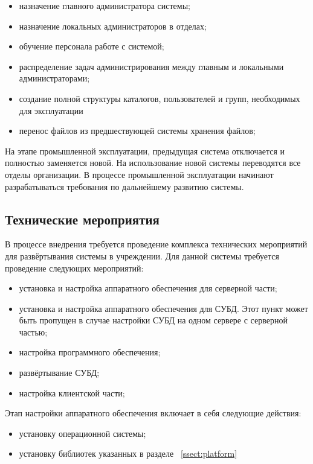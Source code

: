 \documentclass[utf8,usehyperref,12pt]{G7-32}
\begin{document}
\begin{itemize}
 \item назначение главного администратора системы;
 \item назначение локальных администраторов в отделах;
 \item обучение персонала работе с системой;
 \item распределение задач администрирования между главным и локальными администраторами;
 \item создание полной структуры каталогов, пользователей и групп, необходимых для эксплуатации
 \item перенос файлов из предшествующей системы хранения файлов;
\end{itemize}

На этапе промышленной эксплуатации, предыдущая система отключается и полностью заменяется новой. На использование новой системы переводятся все отделы организации. В процессе промышленной эксплуатации начинают разрабатываться требования по дальнейшему развитию системы.

\subsection{Технические мероприятия}

В процессе внедрения требуется проведение комплекса технических мероприятий для развёртывания системы в учреждении. Для данной системы требуется проведение следующих мероприятий:
\begin{itemize}
 \item установка и настройка аппаратного обеспечения для серверной части;
 \item установка и настройка аппаратного обеспечения для СУБД. Этот пункт может быть пропущен в случае настройки СУБД на одном сервере с серверной частью;
 \item настройка программного обеспечения;
 \item развёртывание СУБД;
 \item настройка клиентской части;
\end{itemize} 

Этап настройки аппаратного обеспечения включает в себя следующие действия:
\begin{itemize}
 \item установку операционной системы;
 \item установку библиотек указанных в разделе ~\ref{ssect:platform}
\end{itemize}
\end{document}
